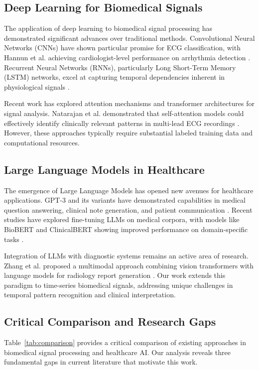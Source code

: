 \documentclass[conference]{IEEEtran}
\begin{document}
\subsection{Deep Learning for Biomedical Signals}
The application of deep learning to biomedical signal processing has demonstrated significant advances over traditional methods. Convolutional Neural Networks (CNNs) have shown particular promise for ECG classification, with Hannun et al. achieving cardiologist-level performance on arrhythmia detection \cite{hannun2019}. Recurrent Neural Networks (RNNs), particularly Long Short-Term Memory (LSTM) networks, excel at capturing temporal dependencies inherent in physiological signals \cite{hochreiter1997}.

Recent work has explored attention mechanisms and transformer architectures for signal analysis. Natarajan et al. demonstrated that self-attention models could effectively identify clinically relevant patterns in multi-lead ECG recordings \cite{natarajan2020}. However, these approaches typically require substantial labeled training data and computational resources.

\subsection{Large Language Models in Healthcare}
The emergence of Large Language Models has opened new avenues for healthcare applications. GPT-3 and its variants have demonstrated capabilities in medical question answering, clinical note generation, and patient communication \cite{brown2020}. Recent studies have explored fine-tuning LLMs on medical corpora, with models like BioBERT and ClinicalBERT showing improved performance on domain-specific tasks \cite{lee2020,alsentzer2019}.

Integration of LLMs with diagnostic systems remains an active area of research. Zhang et al. proposed a multimodal approach combining vision transformers with language models for radiology report generation \cite{zhang2021}. Our work extends this paradigm to time-series biomedical signals, addressing unique challenges in temporal pattern recognition and clinical interpretation.

\subsection{Critical Comparison and Research Gaps}

Table~\ref{tab:comparison} provides a critical comparison of existing approaches in biomedical signal processing and healthcare AI. Our analysis reveals three fundamental gaps in current literature that motivate this work.
\end{document}
